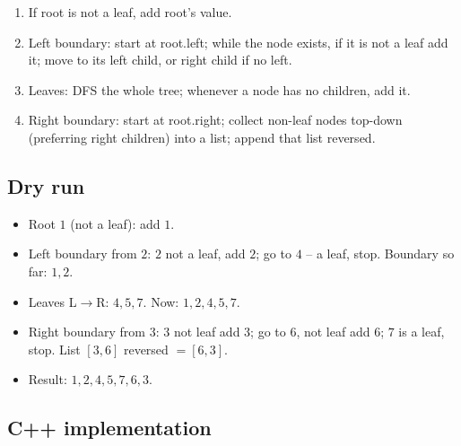 \begin{enumerate}
  \item If root is not a leaf, add root's value.
  \item Left boundary: start at root.left; while the node exists, if it is
        not a leaf add it; move to its left child, or right child if no
        left.
  \item Leaves: DFS the whole tree; whenever a node has no children, add
        it.
  \item Right boundary: start at root.right; collect non-leaf nodes
        top-down (preferring right children) into a list; append that
        list reversed.
\end{enumerate}

\subsection*{Dry run}


\begin{itemize}
  \item Root $1$ (not a leaf): add $1$.
  \item Left boundary from $2$: $2$ not a leaf, add $2$; go to $4$ -- a
        leaf, stop. Boundary so far: $1,2$.
  \item Leaves L$\to$R: $4,5,7$. Now: $1,2,4,5,7$.
  \item Right boundary from $3$: $3$ not leaf add $3$; go to $6$, not leaf
        add $6$; $7$ is a leaf, stop. List $[3,6]$ reversed $=[6,3]$.
  \item Result: $1,2,4,5,7,6,3$.
\end{itemize}

\subsection*{C++ implementation}

